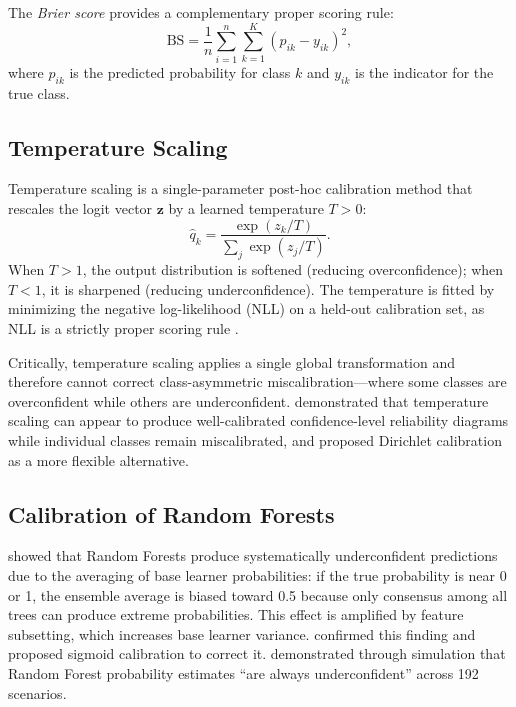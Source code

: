 \documentclass[twocolumn]{aastex631}
\begin{document}
The \emph{Brier score} \citep{brier1950} provides a complementary proper scoring rule:
\begin{equation}
\text{BS} = \frac{1}{n} \sum_{i=1}^{n} \sum_{k=1}^{K} (p_{ik} - y_{ik})^2,
\end{equation}
where $p_{ik}$ is the predicted probability for class $k$ and $y_{ik}$ is the indicator for the true class.

\subsection{Temperature Scaling}

Temperature scaling \citep{guo2017} is a single-parameter post-hoc calibration method that rescales the logit vector $\mathbf{z}$ by a learned temperature $T > 0$:
\begin{equation}
\hat{q}_k = \frac{\exp(z_k / T)}{\sum_{j} \exp(z_j / T)}.
\end{equation}
When $T > 1$, the output distribution is softened (reducing overconfidence); when $T < 1$, it is sharpened (reducing underconfidence). The temperature is fitted by minimizing the negative log-likelihood (NLL) on a held-out calibration set, as NLL is a strictly proper scoring rule \citep{gneiting2007}.

Critically, temperature scaling applies a single global transformation and therefore cannot correct class-asymmetric miscalibration---where some classes are overconfident while others are underconfident. \citet{kull2019} demonstrated that temperature scaling can appear to produce well-calibrated confidence-level reliability diagrams while individual classes remain miscalibrated, and proposed Dirichlet calibration as a more flexible alternative.

\subsection{Calibration of Random Forests}

\citet{niculescumizil2005} showed that Random Forests produce systematically underconfident predictions due to the averaging of base learner probabilities: if the true probability is near 0 or 1, the ensemble average is biased toward 0.5 because only consensus among all trees can produce extreme probabilities. This effect is amplified by feature subsetting, which increases base learner variance. \citet{bostrom2008} confirmed this finding and proposed sigmoid calibration to correct it. \citet{loecher2024} demonstrated through simulation that Random Forest probability estimates ``are always underconfident'' across 192 scenarios.
\end{document}
